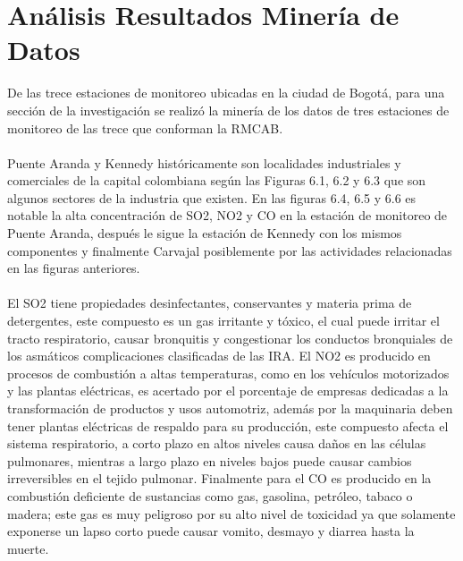 \documentclass[a4paper,openright,12pt]{book}
\theoremstyle{definition}
\theoremstyle{remark}
\begin{document}
\section{Análisis Resultados Minería de Datos}
De las trece estaciones de monitoreo ubicadas en la ciudad de Bogotá, para una sección de la investigación se realizó la minería de los datos de tres estaciones de monitoreo de las trece que conforman la RMCAB.\\\\Puente Aranda y Kennedy históricamente son localidades industriales y comerciales de la capital colombiana según las Figuras 6.1, 6.2 y 6.3 que son algunos sectores de la industria que existen. En las figuras 6.4, 6.5 y 6.6 es notable la alta concentración de SO2, NO2 y CO en la estación de monitoreo de Puente Aranda, después le sigue la estación de Kennedy con los mismos componentes y finalmente Carvajal posiblemente por las actividades  relacionadas en las figuras anteriores.\\\\El SO2 tiene propiedades desinfectantes, conservantes y materia prima de detergentes, este compuesto es un gas irritante y tóxico, el cual puede irritar el tracto respiratorio, causar bronquitis y congestionar los conductos bronquiales de los asmáticos complicaciones clasificadas de las IRA. El NO2 es producido en procesos de combustión a altas temperaturas, como en los vehículos motorizados y las plantas eléctricas, es acertado por el porcentaje de empresas dedicadas a la transformación de productos y usos automotriz, además por la maquinaria deben tener plantas eléctricas de respaldo para su producción, este compuesto afecta el sistema respiratorio, a corto plazo en altos niveles causa daños en las células pulmonares, mientras a largo plazo en niveles bajos  puede causar cambios irreversibles en el tejido pulmonar. Finalmente para el CO es producido en la combustión deficiente de sustancias como gas, gasolina, petróleo, tabaco o madera; este gas es muy peligroso por su alto nivel de toxicidad ya que solamente exponerse un lapso corto puede causar vomito, desmayo y diarrea hasta la muerte.\\\\
\end{document}
